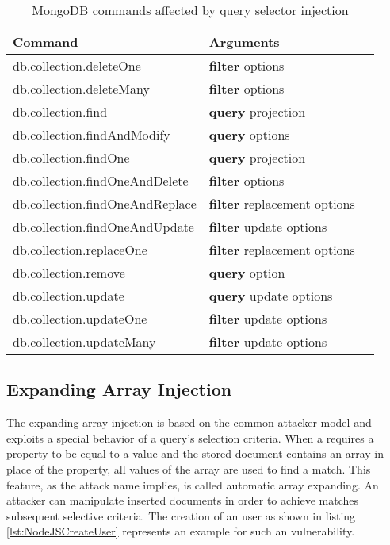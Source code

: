 \begin{table}[h]
 \sffamily
 \centering
 \begin{tabular}{lll}
  \textbf{Command} & \textbf{Arguments} \\ \hline
  db.collection.deleteOne         & \textbf{filter} options \\
  db.collection.deleteMany        & \textbf{filter} options \\
  db.collection.find              & \textbf{query} projection \\
  db.collection.findAndModify     & \textbf{query} options \\
  db.collection.findOne           & \textbf{query} projection \\
  db.collection.findOneAndDelete  & \textbf{filter} options \\
  db.collection.findOneAndReplace & \textbf{filter} replacement options \\
  db.collection.findOneAndUpdate  & \textbf{filter} update options \\
  db.collection.replaceOne        & \textbf{filter} replacement options \\
  db.collection.remove            & \textbf{query} option \\
  db.collection.update            & \textbf{query} update options \\
  db.collection.updateOne         & \textbf{filter} update options \\
  db.collection.updateMany        & \textbf{filter} update options \\
  \bottomrule 
 \end{tabular}
 \caption{MongoDB commands affected by query selector injection}
 \label{tab:redis_commands_affected}
\end{table}

\subsection{Expanding Array Injection}
The expanding array injection is based on the common attacker model and exploits a special behavior of a query's selection criteria. When a requires a property to be equal to a value and the stored document contains an array in place of the property, all values of the array are used to find a match. This feature, as the attack name implies, is called automatic array expanding. An attacker can manipulate inserted documents in order to achieve matches subsequent selective criteria. The creation of an user as shown in listing \ref{lst:NodeJSCreateUser} represents an example for such an vulnerability. \\

